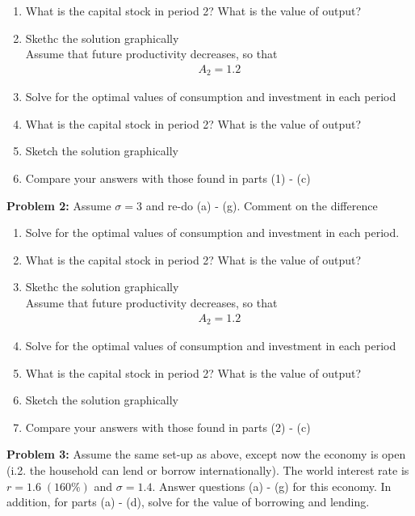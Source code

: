 \documentclass[11pt]{SelfArxOneColBMN}
\begin{document}
\begin{enumerate}[label=(\alph*)]
\begin{solution}
        
    \end{solution}
    \item What is the capital stock in period 2? What is the value of output?
    \item Skethc the solution graphically\\
    Assume that future productivity decreases, so that
    \begin{eqnarray*}
        A_2 = 1.2
    \end{eqnarray*}
    \item Solve for the optimal values of consumption and investment in each period
    \item What is the capital stock in period 2? What is the value of output?
    \item Sketch the solution graphically
    \item Compare your answers with those found in parts (1) - (c)
\end{enumerate}

\textbf{Problem 2: }Assume $\sigma = 3$ and re-do (a) - (g). Comment on the difference\\
\begin{enumerate}[label=(\alph*)]
    \item Solve for the optimal values of consumption and investment in each period.
    \item What is the capital stock in period 2? What is the value of output?
    \item Skethc the solution graphically\\
    Assume that future productivity decreases, so that
    \begin{eqnarray*}
        A_2 = 1.2
    \end{eqnarray*}
    \item Solve for the optimal values of consumption and investment in each period
    \item What is the capital stock in period 2? What is the value of output?
    \item Sketch the solution graphically
    \item Compare your answers with those found in parts (2) - (c)
\end{enumerate}

\textbf{Problem 3: }Assume the same set-up as above, except now the economy is open (i.2. the household can lend or borrow internationally). The world interest rate is $r = 1.6 \; (160\%)$ and $\sigma = 1.4$. Answer questions (a) - (g) for this economy. In addition, for parts (a) - (d), solve for the value of borrowing and lending. 

\end{document}
